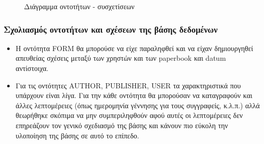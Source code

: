 \documentclass{assignment}
\begin{document}
\begin{figure}
\begin{center}
\caption{Διάγραμμα οντοτήτων - συσχετίσεων}
\label{fig:ER:diagram}
\end{center}
\end{figure}

\subsubsection{Σχολιασμός οντοτήτων και σχέσεων της βάσης δεδομένων}
\begin{itemize}
  \item Η οντότητα FORM θα μπορούσε να είχε παραληφθεί και να είχαν δημιουργηθεί απευθείας σχέσεις μεταξύ των χρηστών και των paperbook και datum αντίστοιχα. 
  \item Για τις οντότητες AUTHOR, PUBLISHER, USER τα χαρακτηριστικά που υπάρχουν είναι λίγα. Για την κάθε οντότητα θα μπορούσαν να καταγραφούν και άλλες λεπτομέρειες (όπως ημερομηνία γέννησης για τους συγγραφείς, κ.λ.π.) αλλά θεωρήθηκε σκόπιμα να μην συμπεριληφθούν αφού αυτές οι λεπτομέρειες δεν επηρεάζουν τον γενικό σχεδιασμό της βάσης και κάνουν πιο εύκολη την υλοποίηση της βάσης σε αυτό το επίπεδο. 
\end{itemize}
\end{document}
